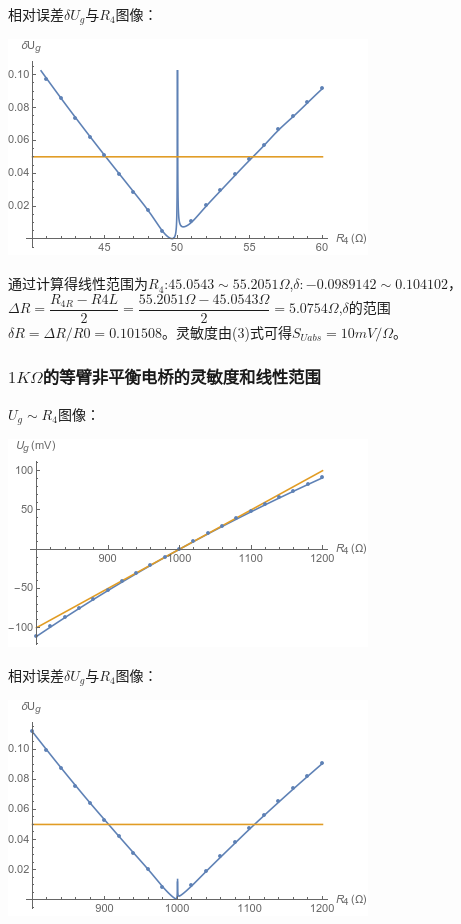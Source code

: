 \documentclass[UEF8]{ctexart}
\begin{document}
\begin{multicols}{2}
相对误差$\delta{U_{g}}$与$R_{4}$图像：

\includegraphics[scale=0.6]{graphs/data50error.png}

通过计算得线性范围为$R_{4}$:$45.0543\sim55.2051\Omega$,$\delta:-0.0989142\sim0.104102$，$\Delta{R}=\dfrac{R_{4R}-R{4L}}{2}=\dfrac{55.2051\Omega-45.0543\Omega}{2}=5.0754\Omega$,$\delta$的范围$\delta{R}=\Delta{R}/R0=0.101508$。灵敏度由(3)式可得$S_{Uabs}=10mV/\Omega$。

\subsubsection{$1K\Omega$的等臂非平衡电桥的灵敏度和线性范围}
$U_{g}\sim{R_{4}}$图像：

\includegraphics[scale=0.6]{graphs/data1K.png}

相对误差$\delta{U_{g}}$与$R_{4}$图像：

\includegraphics[scale=0.6]{graphs/data1Kerror.png}


\end{multicols}
\end{document}
